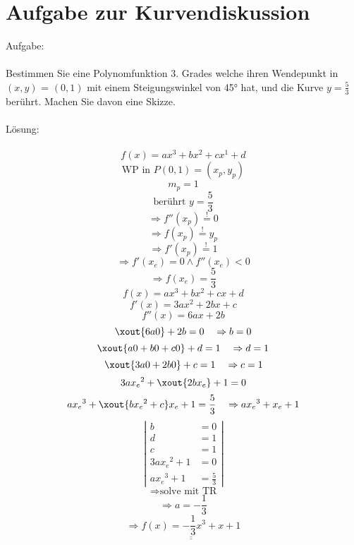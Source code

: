 



\section{Aufgabe zur Kurvendiskussion}
Aufgabe: \\\\
Bestimmen Sie eine Polynomfunktion 3. Grades welche ihren Wendepunkt in $(x, y)$ = $(0, 1)$ mit einem Steigungswinkel von 45° hat, und die Kurve $y = \frac{5}{3}$ berührt. Machen Sie davon eine Skizze.\\\\

Lösung: \\\\
\[ f(x) = ax^3 + bx^2 + cx^1 + d \]
\[ \text{WP in }P(0,1) = (x_p, y_p) \]
\[ m_p = 1 \]
\[ \text{berührt }y = \frac{5}{3} \]
\[ \Rightarrow f''(x_p) \stackrel{!}{=} 0 \]
\[ \Rightarrow f(x_p) \stackrel{!}{=} y_p \]
\[ \Rightarrow f'(x_p) \stackrel{!}{=} 1 \]
\[ \Rightarrow f'(x_e) = 0 \land f''(x_e) < 0 \]
\[ \Rightarrow f(x_e) = \frac{5}{3} \]
\[ f(x) = ax^3 + bx^2 + cx + d \]
\[ f'(x) = 3ax^2 + 2bx + c \]
\[ f''(x) = 6ax + 2b \]
\[ \xout{6a0} + 2b = 0 \quad \Rightarrow b = 0 \]
\[ \xout{a0 + b0 + c0} + d = 1 \quad \Rightarrow d = 1 \]
\[ \xout{3a0 + 2b0} + c = 1 \quad \Rightarrow c = 1 \]
\[ 3a{x_e}^2 + \xout{2bx_e} + 1 = 0 \]
\[ a{x_e}^3 + \xout{b{x_e}^2 + c}x_e + 1 = \frac{5}{3} \quad \Rightarrow a{x_e}^3 + x_e + 1 \]
\[ \left|\begin{array}{rl}
b            &= 0\\
d            &= 1\\
c            &= 1 \\
3a{x_e}^2 + 1 &= 0\\
a{x_e}^3 + 1 &= \frac{5}{3}
\end{array}\right| \]
\[ \Rightarrow \text{solve mit TR} \]
\[ \Rightarrow a = -\frac{1}{3} \]
\[ \Rightarrow \underline{\underline{f(x) = -\frac{1}{3}x^3 + x+1}} \]